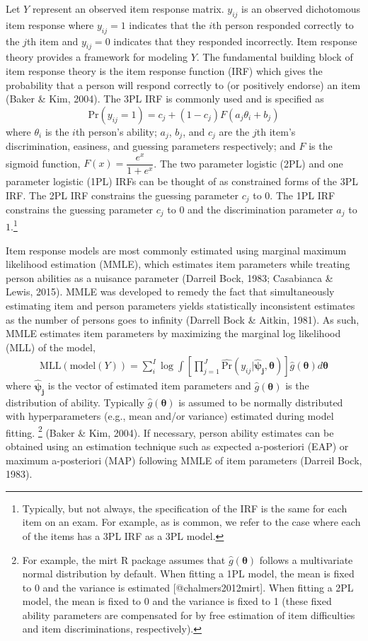 \documentclass[
  english,
  man,floatsintext]{apa7}
\begin{document}
Let \(Y\) represent an observed item response matrix. \(y_{ij}\) is an observed dichotomous item response where \(y_{ij} = 1\) indicates that the \(i\)th person responded correctly to the \(j\)th item and \(y_{ij} = 0\) indicates that they responded incorrectly. Item response theory provides a framework for modeling \(Y\). The fundamental building block of item response theory is the item response function (IRF) which gives the probability that a person will respond correctly to (or positively endorse) an item (Baker \& Kim, 2004). The 3PL IRF is commonly used and is specified as
\begin{equation}
    \text{Pr}(y_{ij} = 1) = c_j + (1 - c_j) F(a_j \theta_i + b_j)
\end{equation}
where \(\theta_i\) is the \(i\)th person's ability; \(a_j\), \(b_j\), and \(c_j\) are the \(j\)th item's discrimination, easiness, and guessing parameters respectively; and \(F\) is the sigmoid function, \(F(x) = \dfrac{e^x}{1 + e^x}\). The two parameter logistic (2PL) and one parameter logistic (1PL) IRFs can be thought of as constrained forms of the 3PL IRF. The 2PL IRF constrains the guessing parameter \(c_j\) to \(0\). The 1PL IRF constrains the guessing parameter \(c_j\) to \(0\) and the discrimination parameter \(a_j\) to \(1\).\footnote{Typically, but not always, the specification of the IRF is the same for each item on an exam. For example, as is common, we refer to the case where each of the items has a 3PL IRF as a 3PL model.}

Item response models are most commonly estimated using marginal maximum likelihood estimation (MMLE), which estimates item parameters while treating person abilities as a nuisance parameter (Darreil Bock, 1983; Casabianca \& Lewis, 2015). MMLE was developed to remedy the fact that simultaneously estimating item and person parameters yields statistically inconsistent estimates as the number of persons goes to infinity (Darrell Bock \& Aitkin, 1981). As such, MMLE estimates item parameters by maximizing the marginal log likelihood (MLL) of the model,
\begin{align}
\text{MLL}(\text{model}(Y))= \sum_{i}^{I} \log \int \left[\prod_{j=1}^{J} \hat{\text{Pr}}(y_{ij} | \bm{\hat\psi_j}, \bm{\theta}) \right] \hat g(\bm{\theta}) d\bm{\theta}
\end{align}
where \(\bm{\hat\psi_j}\) is the vector of estimated item parameters and \(\hat g(\bm{\theta})\) is the distribution of ability. Typically \(\hat g(\bm{\theta})\) is assumed to be normally distributed with hyperparameters (e.g., mean and/or variance) estimated during model fitting. \footnote{For example, the mirt R package assumes that $\hat g(\bm{\theta})$ follows a multivariate normal distribution by default. When fitting a 1PL model, the mean is fixed to 0 and the variance is estimated [@chalmers2012mirt]. When fitting a 2PL model, the mean is fixed to 0 and the variance is fixed to 1 (these fixed ability parameters are compensated for by free estimation of item difficulties and item discriminations, respectively).} (Baker \& Kim, 2004). If necessary, person ability estimates can be obtained using an estimation technique such as expected a-posteriori (EAP) or maximum a-posteriori (MAP) following MMLE of item parameters (Darreil Bock, 1983).
\end{document}
